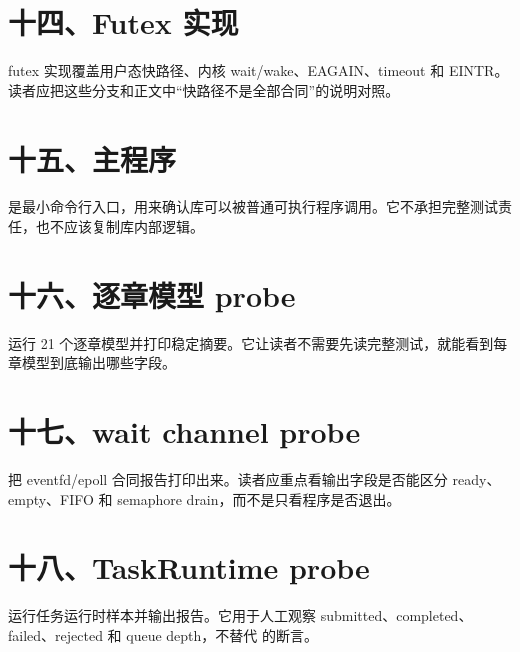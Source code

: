 \section{十四、Futex 实现}

futex 实现覆盖用户态快路径、内核 wait/wake、EAGAIN、timeout 和 EINTR。读者应把这些分支和正文中“快路径不是全部合同”的说明对照。



\section{十五、主程序}

 是最小命令行入口，用来确认库可以被普通可执行程序调用。它不承担完整测试责任，也不应该复制库内部逻辑。



\section{十六、逐章模型 probe}

 运行 21 个逐章模型并打印稳定摘要。它让读者不需要先读完整测试，就能看到每章模型到底输出哪些字段。



\section{十七、wait channel probe}

 把 eventfd/epoll 合同报告打印出来。读者应重点看输出字段是否能区分 ready、empty、FIFO 和 semaphore drain，而不是只看程序是否退出。



\section{十八、TaskRuntime probe}

 运行任务运行时样本并输出报告。它用于人工观察 submitted、completed、failed、rejected 和 queue depth，不替代  的断言。

